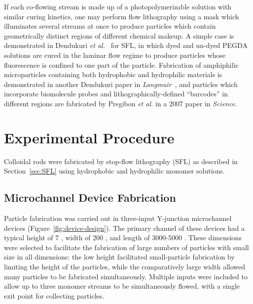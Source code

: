 If each co-flowing stream is made up of a photopolymerizable solution with similar curing kinetics, one may perform
flow lithography using a mask which illuminates several streams at once to produce particles which contain geometrically
distinct regions of different chemical makeup.  A simple case 
is demonstrated in Dendukuri \textit{et al.}~\cite{dendukuri-sfl}
for SFL, in which dyed and un-dyed PEGDA solutions are cured in the laminar flow regime to produce particles whose
fluorescence is confined to one part of the particle.  Fabrication of amphiphilic microparticles containing both
hydrophobic and hydrophilic materials is demonstrated in another Dendukuri paper in 
\textit{Langmuir}~\cite{dendukuri-amph}, and particles which incorporate biomolecule probes and lithographically-defined
``barcodes'' in different regions are fabricated by Pregibon \textit{et al.} in a 2007 paper in 
\textit{Science}.~\cite{pregibon-dna}

\section{Experimental Procedure}
\label{sec:rods-exp}

Colloidal rods were fabricated by stop-flow lithography (SFL) as described in Section~\ref{sec:SFL} using
hydrophobic and hydrophilic monomer solutions.  

\subsection{Microchannel Device Fabrication}


Particle fabrication was carried out in 
three-input Y-junction microchannel devices (Figure~\ref{fig:device-design}).
The primary channel of these devices had a typical 
height of 7 \microns, width of 200 \microns, and length of 3000-5000 \microns. These dimensions were selected
to facilitate the fabrication of large numbers of particles with small size in all dimensions: the low height
facilitated small-particle fabrication by limiting the height of the particles, while the comparatively large
width allowed many particles to be fabricated simultaneously. Multiple inputs were included to allow up to three
monomer streams to be simultaneously flowed, with a single exit point for collecting particles.

